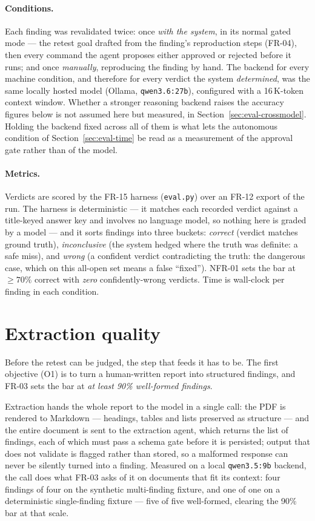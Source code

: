 \paragraph{Conditions.} Each finding was revalidated twice: once \emph{with the
system}, in its normal gated mode --- the retest goal drafted from the finding's
reproduction steps (FR-04), then every command the agent proposes either approved or
rejected before it runs; and once \emph{manually}, reproducing the finding by hand. The
backend for every machine condition, and therefore for every verdict the system
\emph{determined}, was the same locally
hosted model (Ollama, \texttt{qwen3.6:27b}), configured with a 16\,K-token context
window. Whether a stronger reasoning backend raises the accuracy figures below is not
assumed here but measured, in Section~\ref{sec:eval-crossmodel}. Holding
the backend fixed across all of them is what lets the autonomous condition of
Section~\ref{sec:eval-time} be read as a measurement of the approval gate rather than of
the model.

\paragraph{Metrics.} Verdicts are scored by the FR-15 harness (\texttt{eval.py})
over an FR-12 export of the run. The harness is deterministic --- it matches each
recorded verdict against a title-keyed answer key and involves no language model, so
nothing here is graded by a model --- and it sorts findings into three buckets: \emph{correct} (verdict matches
ground truth), \emph{inconclusive} (the system hedged where the truth was definite: a
safe miss), and \emph{wrong} (a confident verdict contradicting the truth: the
dangerous case, which on this all-open set means a false ``fixed''). NFR-01 sets the
bar at $\geq 70\%$ correct with \emph{zero} confidently-wrong verdicts. Time is
wall-clock per finding in each condition.

\section{Extraction quality}
\label{sec:eval-extraction}

Before the retest can be judged, the step that feeds it has to be. The first
objective (O1) is to turn a human-written report into structured findings, and FR-03
sets the bar at \emph{at least 90\% well-formed findings}.

Extraction hands the whole report to the model in a single call: the PDF is rendered
to Markdown --- headings, tables and lists preserved as structure --- and the entire
document is sent to the extraction agent, which returns the list of findings, each of
which must pass a schema gate before it is persisted; output that does not validate is
flagged rather than stored, so a malformed response can never be silently turned into a
finding. Measured on a local \texttt{qwen3.5:9b} backend, the call does what FR-03 asks
of it on documents that fit its context: four findings of four on the synthetic
multi-finding fixture, and one of one on a deterministic single-finding fixture --- five
of five well-formed, clearing the 90\% bar at that scale.


